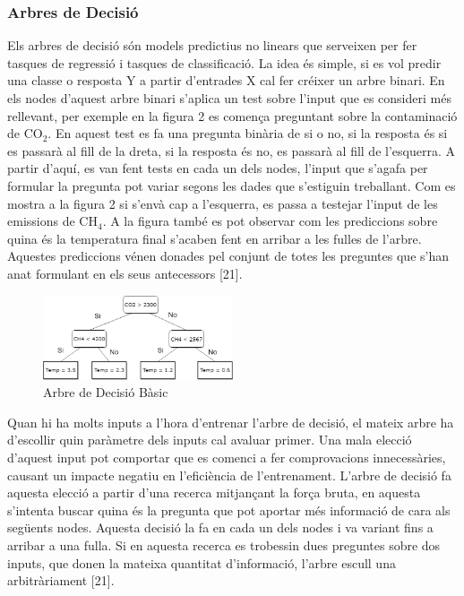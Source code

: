 \documentclass[10pt,a4paper,twocolumn,twoside]{article}
\begin{document}
\subsubsection{Arbres de Decisió} Els arbres de decisió són models predictius no linears que serveixen per fer tasques de regressió i tasques de classificació. La idea és simple, si es vol predir una classe o resposta Y a partir d'entrades X cal fer créixer un arbre binari. En els nodes d'aquest arbre binari s'aplica un test sobre l'input que es consideri més rellevant, per exemple en la figura 2 es comença preguntant sobre la contaminació de CO$_2$. En aquest test es fa una pregunta binària de si o no, si la resposta és si es passarà al fill de la dreta, si la resposta és no, es passarà al fill de l'esquerra. A partir d'aquí, es van fent tests en cada un dels nodes, l'input que s'agafa per formular la pregunta pot variar segons les dades que s'estiguin treballant. Com es mostra a la figura 2 si s'envà cap a l'esquerra, es passa a testejar l'input de les emissions de CH$_4$. A la figura també es pot observar com les prediccions sobre quina és la temperatura final s'acaben fent en arribar a les fulles de l'arbre. Aquestes prediccions vénen donades pel conjunt de totes les preguntes que s'han anat formulant en els seus antecessors [21].
\begin{figure}[!h]
\centering
	\includegraphics[width=0.5\textwidth]{../img/arbreDecisioSimple}
	\caption{Arbre de Decisió Bàsic}
	\label{fig-DecisionTree}
\end{figure}

Quan hi ha molts inputs a l'hora d'entrenar l'arbre de decisió, el mateix arbre ha d'escollir quin paràmetre dels inputs cal avaluar primer. Una mala elecció d'aquest input pot comportar que es comenci a fer comprovacions innecessàries, causant un impacte negatiu en l'eficiència de l'entrenament. L'arbre de decisió fa aquesta elecció a partir d'una recerca mitjançant la força bruta, en aquesta s'intenta buscar quina és la pregunta que pot aportar més informació de cara als següents nodes. Aquesta decisió la fa en cada un dels nodes i va variant fins a arribar a una fulla. Si en aquesta recerca es trobessin dues preguntes sobre dos inputs, que donen la mateixa quantitat d'informació, l'arbre escull una arbitràriament [21].
\end{document}
